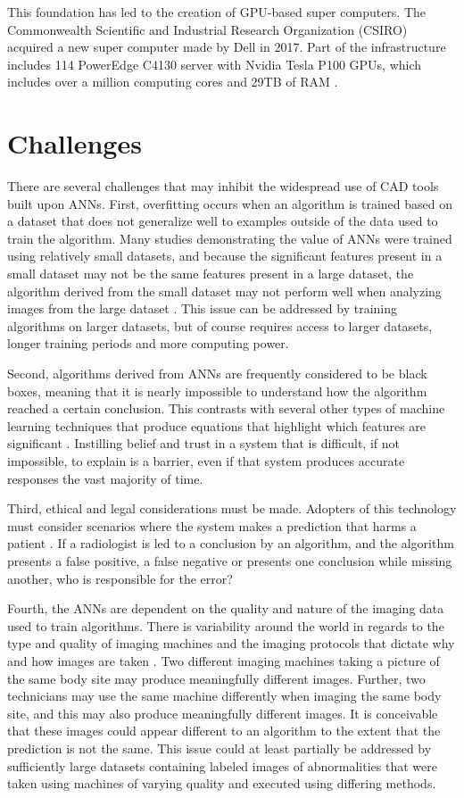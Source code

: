 \documentclass[sigconf]{acmart}
\begin{document}
This foundation has led to the creation of GPU-based super computers. The Commonwealth Scientific and Industrial Research Organization (CSIRO) acquired a new super computer made by Dell in 2017. Part of the infrastructure includes 114 PowerEdge C4130 server with Nvidia Tesla P100 GPUs, which includes over a million computing cores and 29TB of RAM \cite{cite15}.


\section{Challenges}

There are several challenges that may inhibit the widespread use of CAD tools built upon ANNs. First, overfitting occurs when an algorithm is trained based on a dataset that does not generalize well to examples outside of the data used to train the algorithm. Many studies demonstrating the value of ANNs were trained using relatively small datasets, and because the significant features present in a small dataset may not be the  same features present in a large dataset, the algorithm derived from the small dataset may not perform well when analyzing images from the large dataset \cite{cite08}\cite{cite05}. This issue can be addressed by training algorithms on larger datasets, but of course requires access to larger datasets, longer training periods and more computing power.

Second, algorithms derived from ANNs are frequently considered to be black boxes, meaning that it is nearly impossible to understand how the algorithm reached a certain conclusion. This contrasts with several other types of machine learning techniques that produce equations that highlight which features are significant \cite{cite05}. Instilling belief and trust in a system that is difficult, if not impossible, to explain is a barrier, even if that system produces accurate responses the vast majority of time.

Third, ethical and legal considerations must be made. Adopters of this technology must consider scenarios where the system makes a prediction that harms a patient \cite{cite05}. If a radiologist is led to a conclusion by an algorithm, and the algorithm presents a false positive, a false negative or presents one conclusion while missing another, who is responsible for the error?

Fourth, the ANNs are dependent on the quality and nature of the imaging data used to train algorithms. There is variability around the world in regards to the type and quality of imaging machines and the imaging protocols that dictate why and how images are taken \cite{cite05}. Two different imaging machines taking a picture of the same body site may produce meaningfully different images. Further, two technicians may use the same machine differently when imaging the same body site, and this may also produce meaningfully different images. It is conceivable that these images could appear different to an algorithm to the extent that the prediction is not the same. This issue could at least partially be addressed by sufficiently large datasets containing labeled images of abnormalities that were taken using machines of varying quality and executed using differing methods.
\end{document}
